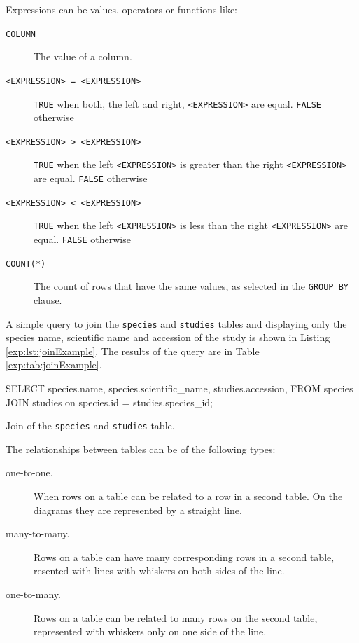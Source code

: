 Expressions can be values, operators or functions like:

\begin{description}
\item[\texttt{COLUMN}] The value of a column. 
\item[ \texttt{<EXPRESSION> = <EXPRESSION>}] \texttt{TRUE} when both, the left and right, \texttt{<EXPRESSION>} are equal. \texttt{FALSE} otherwise 
\item[ \texttt{<EXPRESSION> > <EXPRESSION>}] \texttt{TRUE} when the left  \texttt{<EXPRESSION>} is greater than the  right \texttt{<EXPRESSION>} are equal. \texttt{FALSE} otherwise 
\item[ \texttt{<EXPRESSION> < <EXPRESSION>}] \texttt{TRUE} when the left  \texttt{<EXPRESSION>} is less than the  right \texttt{<EXPRESSION>} are equal. \texttt{FALSE} otherwise
\item[ \texttt{COUNT(*)}] The count of rows that have the same values, as selected in the \texttt{GROUP BY} clause.
\end{description}

A simple query to join the  \texttt{species} and \texttt{studies} tables and displaying only the species name, scientific name and accession of the study is shown in Listing \ref{exp:lst:joinExample}. 
The results of the query are in Table \ref{exp:tab:joinExample}. 

\begin{code}[language=sql, label=exp:lst:joinExample,caption=Join example query]
SELECT 
	species.name, 
	species.scientific_name, 
	studies.accession, 
FROM species
JOIN studies on species.id = studies.species_id;
\end{code}

\begin{table}[h!]

\caption[Join example]{Join of the \texttt{species} and \texttt{studies} table. }
\label{exp:tab:joinExample}
\centering

\end{table}


The relationships between tables can be of the following types:

\begin{description}
\item[one-to-one.] When rows on a table can be related to a row in a second table. On the diagrams they are represented by a straight line.
\item[many-to-many.] Rows on a table can have many corresponding rows in a second table, resented with lines with whiskers on both sides of the line.  
\item[one-to-many.] Rows on a table can be related to many rows on the second table, represented with whiskers only on one side of the line. 
\end{description}

